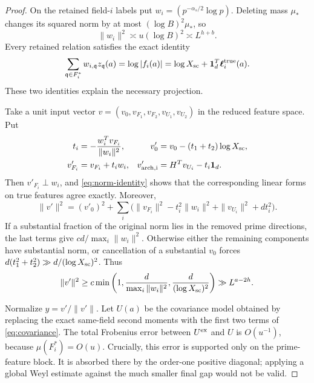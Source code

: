 \begin{proof}
On the retained field-\(i\) labels put
\(w_i=(p^{-\alpha_s/2}\log p)\).  Deleting mass \(\mu_*\) changes
its squared norm by at most \((\log B)^2\mu_*\), so
\begin{equation}\label{eq:wi-norm}
 \|w_i\|^2\asymp u(\log B)^2\asymp L^{h+b}.
\end{equation}
Every retained relation satisfies the exact identity
\begin{equation}\label{eq:norm-identity}
 \sum_{\mathfrak q\in F_i^*}w_{i,\mathfrak q}z_{\mathfrak q}(a)
      =\log|f_i(a)|
      =\log X_{\rm sc}+\mathbf1_d^T
                               \boldsymbol\ell_i^{\rm true}(a).
\end{equation}
These two identities explain the necessary projection.

Take a unit input vector
\(v=(v_0,v_{F_1},v_{F_2},v_{U_1},v_{U_2})\) in the reduced
feature space.  Put
\begin{align*}
 t_i&=-\frac{w_i^Tv_{F_i}}{\|w_i\|^2},&
 v'_0&=v_0-(t_1+t_2)\log X_{\rm sc},\\
 v'_{F_i}&=v_{F_i}+t_iw_i,&
 v'_{\rm arch,i}&=H^Tv_{U_i}-t_i\mathbf1_d.
\end{align*}
Then \(v'_{F_i}\perp w_i\), and \eqref{eq:norm-identity} shows
that the corresponding linear forms on true features agree exactly.
Moreover,
\[
 \|v'\|^2=(v'_0)^2+
   \sum_i\bigl(\|v_{F_i}\|^2-t_i^2\|w_i\|^2
                       +\|v_{U_i}\|^2+dt_i^2\bigr).
\]
If a substantial fraction of the original norm lies in the removed
prime directions, the last terms give \(cd/\max_i\|w_i\|^2\).
Otherwise either the remaining components have substantial norm,
or cancellation of a substantial \(v_0\) forces
\(d(t_1^2+t_2^2)\gg d/(\log X_{\rm sc})^2\).  Thus
\begin{equation}\label{eq:projection-loss}
 \|v'\|^2\ge c\min\left(1,
        \frac d{\max_i\|w_i\|^2},
        \frac d{(\log X_{\rm sc})^2}\right)
       \gg L^{a-2h}.
\end{equation}

Normalize \(y=v'/\|v'\|\).  Let \(U(a)\) be the covariance model
obtained by replacing the exact same-field second moments with the
first two terms of \eqref{eq:covariance}.  The total Frobenius error
between \(U^{\rm ex}\) and \(U\) is \(O(u^{-1})\), because
\(\mu(F_i^*)=O(u)\).  Crucially, this error is supported only on
the prime-feature block.  It is absorbed there by the order-one
positive diagonal; applying a global Weyl estimate against the much
smaller final gap would not be valid.


\end{proof}
